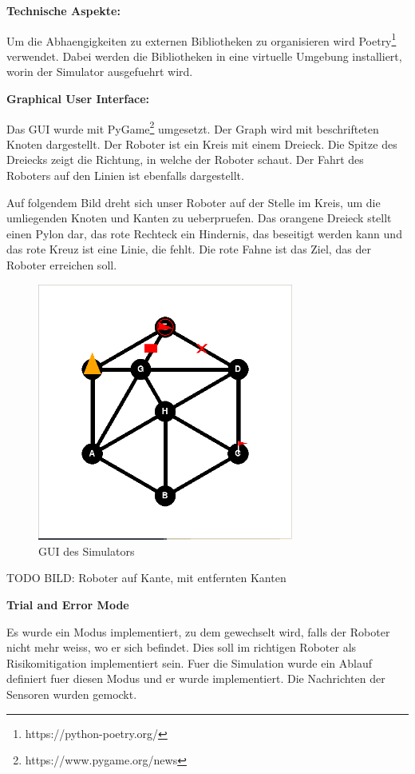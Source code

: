 \textbf{Technische Aspekte:}

Um die Abhaengigkeiten zu externen Bibliotheken zu organisieren wird Poetry\footnote{https://python-poetry.org/} verwendet. Dabei werden die Bibliotheken in eine virtuelle Umgebung installiert, worin der Simulator ausgefuehrt wird.

\textbf{Graphical User Interface:}

Das GUI wurde mit PyGame\footnote{https://www.pygame.org/news} umgesetzt. Der Graph wird mit beschrifteten Knoten dargestellt. Der Roboter ist ein Kreis mit einem Dreieck. Die Spitze des Dreiecks zeigt die Richtung, in welche der Roboter schaut.
Der Fahrt des Roboters auf den Linien ist ebenfalls dargestellt.

Auf folgendem Bild dreht sich unser Roboter auf der Stelle im Kreis, um die umliegenden Knoten und Kanten zu ueberpruefen.
Das orangene Dreieck stellt einen Pylon dar, das rote Rechteck ein Hindernis, das beseitigt werden kann und das rote Kreuz ist eine Linie, die fehlt. Die rote Fahne ist das Ziel, das der Roboter erreichen soll.

\begin{figure}[H]
\centering
\includegraphics[width=0.75\textwidth]{assets/informatik-prototyp/simulator/sim-ui.png}
\caption{GUI des Simulators}
\label{fig:sim-gui}
\end{figure}

TODO BILD: Roboter auf Kante, mit entfernten Kanten 

\textbf{Trial and Error Mode}

Es wurde ein Modus implementiert, zu dem gewechselt wird, falls der Roboter nicht mehr weiss, wo er sich befindet. Dies soll im richtigen Roboter als Risikomitigation implementiert sein. Fuer die Simulation wurde ein Ablauf definiert fuer diesen Modus und er wurde implementiert. Die Nachrichten der Sensoren wurden gemockt.

